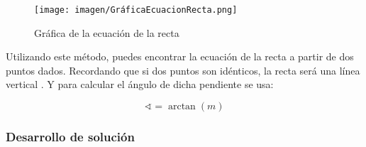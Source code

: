 \begin{figure}[h!]
    \centerline{\texttt{[image: imagen/GráficaEcuacionRecta.png]}}
    \caption{Gráfica de la ecuación de la recta}
    \label{fig}
\end{figure}
Utilizando este método, puedes encontrar la ecuación de la recta a partir de dos puntos dados. Recordando que si dos puntos son idénticos, la recta será una línea vertical \cite{articuloRecta}.
Y para calcular el ángulo de dicha pendiente se usa: 

\begin{equation}
    \sphericalangle=\arctan(m)
\end{equation}


\subsubsection{Desarrollo de solución}
